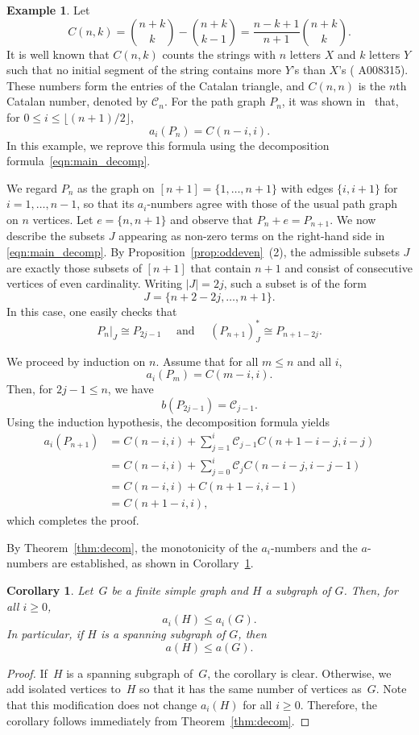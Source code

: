 \documentclass[10pt]{amsart}
\theoremstyle{plain}
\newtheorem{corollary}[theorem]{Corollary}
\numberwithin{equation}{section}
\theoremstyle{definition}
\newtheorem{example}[theorem]{Example}
\newcommand{\cC}{\mathcal{C}}
\begin{document}
\begin{example} \label{example:path}
Let
$$
    C(n,k) = \binom{n+k}{k} - \binom{n+k}{k-1}
           = \frac{n-k+1}{n+1}\binom{n+k}{k}.
$$
It is well known that $C(n,k)$ counts the strings with $n$ letters $X$ and $k$ letters $Y$ such that no initial segment of the string contains more $Y$'s than $X$'s (\cite{oeis} A008315).
These numbers form the entries of the Catalan triangle, and $C(n,n)$ is the $n$th Catalan number, denoted by $\cC_n$.
For the path graph $P_n$, it was shown in~\cite{Choi-Park2015} that, for $0\le i\le \lfloor (n+1)/2\rfloor$,
$$
    a_i(P_n) = C(n-i,i).
$$
In this example, we reprove this formula using the decomposition formula~\eqref{eqn:main_decomp}.

We regard $P_n$ as the graph on $[n+1]=\{1,\ldots,n+1\}$ with edges $\{i,i+1\}$ for $i=1,\ldots,n-1$, so that its $a_i$-numbers agree with those of the usual path graph on $n$ vertices. 
Let $e=\{n,n+1\}$ and observe that $P_n+e = P_{n+1}$.
We now describe the subsets $J$ appearing as non-zero terms on the right-hand side in \eqref{eqn:main_decomp}. 
By Proposition~\ref{prop:oddeven}~(2), the admissible subsets $J$ are exactly those subsets of $[n+1]$ that contain $n+1$ and consist of consecutive vertices of even cardinality. 
Writing $|J|=2j$, such a subset is of the form
$$
    J = \{n+2-2j,\ldots,n+1\}.
$$
In this case, one easily checks that
$$
    P_n|_J \cong P_{2j-1} \quad\text{ and }\quad (P_{n+1})^\ast_J \cong P_{n+1-2j}.
$$

We proceed by induction on $n$. Assume that for all $m \leq n$ and all $i$,
$$
    a_i(P_m) = C(m-i,i).
$$
Then, for $2j-1 \leq n$, we have
$$
    b(P_{2j-1}) = \cC_{j-1}.
$$
Using the induction hypothesis, the decomposition formula yields
\begin{align*}
    a_i(P_{n+1}) &= C(n-i,i) +\sum_{j=1}^{i} \cC_{j-1} C(n+1-i-j, i-j) \\
  &  = C(n-i,i) + \sum_{j=0}^{i} \cC_{j} C(n-i-j, i-j-1) \\
  &  = C(n-i,i) + C(n+1-i, i-1) \\
  &  = C(n+1-i,i), 
\end{align*}
which completes the proof.
\end{example}

By Theorem~\ref{thm:decom}, the monotonicity of the $a_i$-numbers and the $a$-numbers are established, as shown in Corollary~\ref{cor:mon}.
\begin{corollary}\label{cor:mon}
    Let~$G$ be a finite simple graph and $H$ a subgraph of $G$.
    Then, for all $i\geq 0$,
    $$
        a_i(H) \leq a_i(G).
    $$
    In particular, if $H$ is a spanning subgraph of $G$, then
    $$
        a(H) \leq a(G).
    $$

\end{corollary}
\begin{proof}
  If~$H$ is a spanning subgraph of~$G$, the corollary is clear.
  Otherwise, we add isolated vertices to~$H$  so that it has the same number of vertices as~$G$.
  Note that this modification does not change $a_i(H)$ for all $i\geq 0$. 
  Therefore, the corollary follows immediately from Theorem~\ref{thm:decom}.   
\end{proof}
\end{document}
